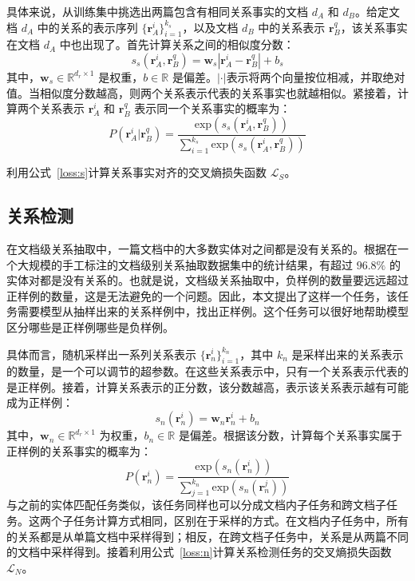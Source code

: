 具体来说，从训练集中挑选出两篇包含有相同关系事实的文档 $d_A$ 和 $d_B$。给定文档 $d_A$ 中的关系的表示序列 $\{\mathbf{r}_A^i\}_{i=1}^{k_s}$，以及文档 $d_B$ 中的关系表示 $\mathbf{r}_B^q$，该关系事实在文档 $d_A$ 中也出现了。首先计算关系之间的相似度分数：
\begin{equation}
	s_s(\mathbf{r}_A^i, \mathbf{r}_B^q) = \mathbf{w}_s\left|\mathbf{r}_A^i - \mathbf{r}_B^q\right| + b_s
\end{equation}
其中，$\mathbf{w}_s \in \mathbb{R}^{d_r \times 1}$ 是权重，$b \in \mathbb{R}$ 是偏差。$\left|\cdot\right|$表示将两个向量按位相减，并取绝对值。当相似度分数越高，则两个关系表示代表的关系事实也就越相似。紧接着，计算两个关系表示 $\mathbf{r}_A^i$ 和 $\mathbf{r}_B^q$ 表示同一个关系事实的概率为：
\begin{equation}
	P(\mathbf{r}_A^i | \mathbf{r}_B^q) = \frac{\text{exp}(s_s(\mathbf{r}_A^i, \mathbf{r}_B^q))}{\sum_{i=1}^{k_s}\text{exp}(s_s(\mathbf{r}_A^i, \mathbf{r}_B^q))}
	\label{loss:s}
\end{equation}

利用公式~\ref{loss:s}计算关系事实对齐的交叉熵损失函数 $\mathcal{L}_S$。


\subsection{关系检测}
在文档级关系抽取中，一篇文档中的大多数实体对之间都是没有关系的。根据在一个大规模的手工标注的文档级别关系抽取数据集中的统计结果，有超过 $96.8\%$ 的实体对都是没有关系的\cite{yao2019docred}。也就是说，文档级关系抽取中，负样例的数量要远远超过正样例的数量，这是无法避免的一个问题。因此，本文提出了这样一个任务，该任务需要模型从抽样出来的关系样例中，找出正样例。这个任务可以很好地帮助模型区分哪些是正样例哪些是负样例。

具体而言，随机采样出一系列关系表示 $\{\mathbf{r}_n^i\}_{i=1}^{k_n}$，其中 $k_n$ 是采样出来的关系表示的数量，是一个可以调节的超参数。在这些关系表示中，只有一个关系表示代表的是正样例。接着，计算关系表示的正分数，该分数越高，表示该关系表示越有可能成为正样例：
\begin{equation}
	s_n(\mathbf{r}_n^i) = \mathbf{w}_n\mathbf{r}_n^i + b_n
	\label{positive_score}
\end{equation}
其中，$\mathbf{w}_n \in \mathbb{R}^{d_r \times 1}$ 为权重，$b_n \in \mathbb{R}$ 是偏差。根据该分数，计算每个关系事实属于正样例的关系事实的概率为：
\begin{equation}
	P(\mathbf{r}_n^i) = \frac{\text{exp}(s_n(\mathbf{r}_n^i))}{\sum_{j = 1}^{k_n}\text{exp}(s_n(\mathbf{r}_n^j))}
	\label{loss:n}
\end{equation}
与之前的实体匹配任务类似，该任务同样也可以分成文档内子任务和跨文档子任务。这两个子任务计算方式相同，区别在于采样的方式。在文档内子任务中，所有的关系都是从单篇文档中采样得到；相反，在跨文档子任务中，关系是从两篇不同的文档中采样得到。接着利用公式~\ref{loss:n}计算关系检测任务的交叉熵损失函数 $\mathcal{L}_N$。

